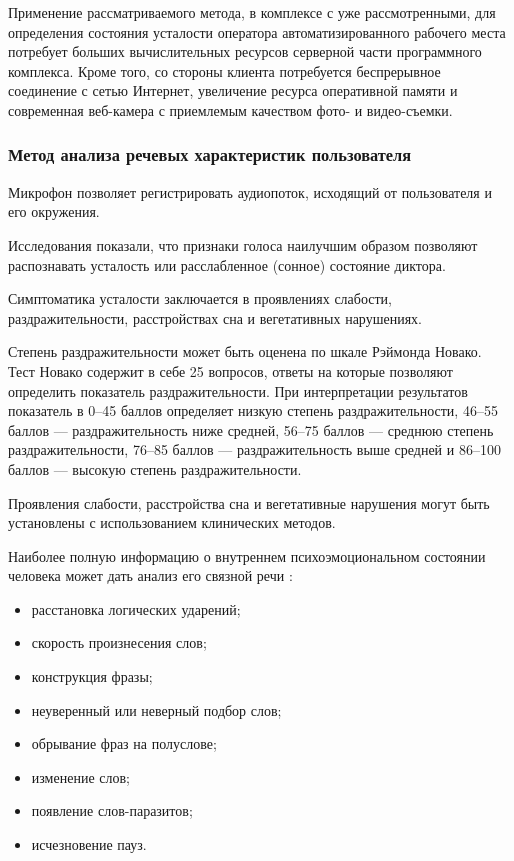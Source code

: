 Применение рассматриваемого метода, в комплексе с уже рассмотренными, для определения состояния усталости оператора автоматизированного рабочего места потребует больших вычислительных ресурсов серверной части программного комплекса. Кроме того, со стороны клиента потребуется беспрерывное соединение с сетью Интернет, увеличение ресурса оперативной памяти и современная веб-камера с приемлемым качеством фото- и видео-съемки.

\subsubsection{Метод анализа речевых характеристик пользователя}
Микрофон позволяет регистрировать аудиопоток, исходящий от пользователя и его окружения.

Исследования показали, что признаки голоса наилучшим образом позволяют распознавать усталость или расслабленное (сонное) состояние диктора. \cite{recognitionOfPsycho} 

Симптоматика усталости заключается в проявлениях слабости, раздражительности, расстройствах сна и вегетативных нарушениях. \cite{medObozr}

Степень раздражительности может быть оценена по шкале Рэймонда Новако. Тест Новако содержит в себе 25 вопросов, ответы на которые позволяют определить показатель раздражительности. При интерпретации результатов показатель в 0--45 баллов определяет низкую степень раздражительности, 46--55 баллов --- раздражительность ниже средней, 56--75 баллов --- среднюю степень раздражительности, 76--85 баллов --- раздражительность выше средней и 86--100 баллов --- высокую степень раздражительности. \cite{novako}

Проявления слабости, расстройства сна и вегетативные нарушения могут быть установлены с использованием клинических методов.


Наиболее полную информацию о внутреннем психоэмоциональном состоянии человека может дать анализ его связной речи \cite{voiceMethod}:
\begin{itemize}[leftmargin=1.6\parindent]
\item расстановка логических ударений;
\item скорость произнесения слов;
\item конструкция фразы;
\item неуверенный или неверный подбор слов;
\item обрывание фраз на полуслове;
\item изменение слов;
\item появление слов-паразитов;
\item исчезновение пауз. 
\end{itemize}

